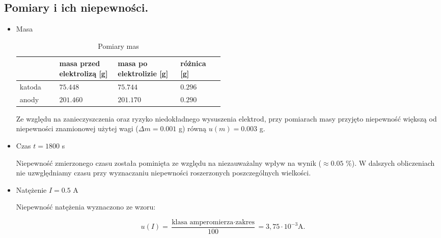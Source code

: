 \documentclass [a4paper,11pt]{article}
\begin{document}
	\subsection{Pomiary i ich niepewności.}
	\begin{itemize}
		\item Masa
			
			\begin{table}
				\label{tab:masaPom}
				\caption{Pomiary mas}
				\begin{center}
				\begin{tabular}{p{0.1\linewidth}|p{0.13\linewidth}|p{0.15\linewidth}|p{0.1\linewidth}}
					&masa przed elektrolizą [g]&masa po elektrolizie [g]& różnica [g]\\
					\hline
					katoda&$75.448$&$75.744$&$0.296$ \\
					\hline
					anody &$201.460$&$201.170$&$0.290$ \\
				\end{tabular} 
					\end{center}	
			\end{table}
			

		Ze względu na zanieczyszczenia oraz ryzyko niedokładnego wysuszenia elektrod, przy pomiarach masy przyjęto niepewność większą od niepewności znamionowej użytej wagi ($\Delta m=0.001$ g) równą $u(m)=0.003$ g. 
		
		\item Czas $ t=1800$ s
		
		Niepewność zmierzonego czasu została pominięta ze względu na niezauważalny wpływ na wynik ($\approx0.05$ \%). W dalszych obliczeniach nie uzwględniamy czasu 
		przy wyznaczaniu niepewności roszerzonych poszczególnych wielkości.
		
		\item Natężenie $I=0.5$ A
		
		Niepewność natężenia wyznaczono ze wzoru:
	\end{itemize}
	\begin{equation}
	\label{eq:amper}
	u(I) = \frac{\text{klasa amperomierza} \cdot \text{zakres}}{100} = 3,75 \cdot 10^{-3} \mathrm{ A}.
	\end{equation}
\end{document}
